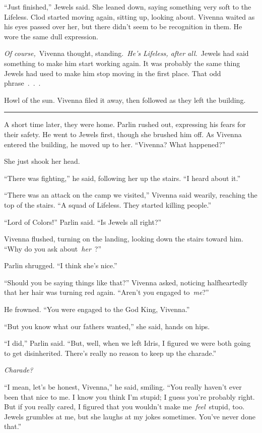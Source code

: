 “Just finished,” Jewels said. She leaned down, saying something very soft to the Lifeless. Clod started moving again, sitting up, looking about. Vivenna waited as his eyes passed over her, but there didn’t seem to be recognition in them. He wore the same dull expression.

\textit{Of course,}~Vivenna thought, standing.~\textit{He’s Lifeless, after all.}~Jewels had said something to make him start working again. It was probably the same thing Jewels had used to make him stop moving in the first place. That odd phrase~.~.~.

Howl of the sun. Vivenna filed it away, then followed as they left the building.

\bigskip \hrule \bigskip

A short time later, they were home. Parlin rushed out, expressing his fears for their safety. He went to Jewels first, though she brushed him off. As Vivenna entered the building, he moved up to her. “Vivenna? What happened?”

She just shook her head.

“There was fighting,” he said, following her up the stairs. “I heard about it.”

“There was an attack on the camp we visited,” Vivenna said wearily, reaching the top of the stairs. “A squad of Lifeless. They started killing people.”

“Lord of Colors!” Parlin said. “Is Jewels all right?”

Vivenna flushed, turning on the landing, looking down the stairs toward him. “Why do you ask about~\textit{her}~?”

Parlin shrugged. “I think she’s nice.”

“Should you be saying things like that?” Vivenna asked, noticing halfheartedly that her hair was turning red again. “Aren’t you engaged to~\textit{me}?”

He frowned. “You were engaged to the God King, Vivenna.”

“But you know what our fathers wanted,” she said, hands on hips.

“I did,” Parlin said. “But, well, when we left Idris, I figured we were both going to get disinherited. There’s really no reason to keep up the charade.”

\textit{Charade?}

“I mean, let’s be honest, Vivenna,” he said, smiling. “You really haven’t ever been that nice to me. I know you think I’m stupid; I guess you’re probably right. But if you really cared, I figured that you wouldn’t make me~\textit{feel}~stupid, too. Jewels grumbles at me, but she laughs at my jokes sometimes. You’ve never done that.”

